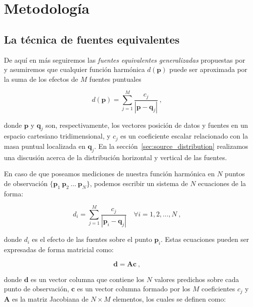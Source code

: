 \section{Metodología}

\subsection{La técnica de fuentes equivalentes}

De aquí en más seguiremos las \emph{fuentes equivalentes generalizadas}
propuestas por \citet{cordell1992}
y asumiremos que cualquier función harmónica $d(\mathbf{p})$
puede ser aproximada por la suma de los efectos de $M$ fuentes puntuales

\begin{equation}
    d(\mathbf{p})
    =
    \sum\limits_{j=1}^{M} \frac{c_j}{| \mathbf{p} - \mathbf{q}_j
    |} \ ,
    \label{eq:eql-forward}
\end{equation}

\noindent donde $\mathbf{p}$ y $\mathbf{q}_j$ son, respectivamente, los
vectores posición de datos y fuentes en un espacio cartesiano tridimensional,
y $c_j$ es un coeficiente escalar relacionado con la masa puntual localizada en
$\mathbf{q}_j$.
En la sección~\ref{sec:source_distribution} realizamos una discusión acerca de
la distribución horizontal y vertical de las fuentes.

En caso de que poseamos mediciones de nuestra función harmónica en $N$ puntos
de observación
$\{\mathbf{p}_1\ \mathbf{p}_2\ \ldots\ \mathbf{p}_N\}$,
podemos escribir un sistema de $N$ ecuaciones de la forma:

\begin{equation}
    d_i
    =
    \sum\limits_{j=1}^{M} \frac{c_j}{| \mathbf{p}_i - \mathbf{q}_j
    |}
    \quad \forall i=1,2,\ldots,N
    \ ,
    \label{eq:forward-sum}
\end{equation}

\noindent donde $d_i$ es el efecto de las fuentes sobre el punto $\mathbf{p}_i$.
Estas ecuaciones pueden ser expresadas de forma matricial como:

\begin{equation}
    \mathbf{d} = \mathbf{A} \mathbf{c} \ ,
    \label{eq:linear-problem}
\end{equation}

\noindent donde $\mathbf{d}$ es un vector columna que contiene los $N$ valores
predichos sobre cada punto de observación,
$\mathbf{c}$ es un vector columna formado por los $M$ coeficientes $c_j$ y
$\mathbf{A}$ es la matriz Jacobiana de $N \times M$ elementos,
los cuales se definen como:

